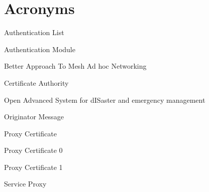 \chapter*{Acronyms}

\begin{acronym}


 {Authentication List}

 {Authentication Module}

 {Better Approach To Mesh Ad hoc Networking}

 {Certificate Authority}










 {Open Advanced System for dISaster and emergency management}

 {Originator Message}



 {Proxy Certificate}

 {Proxy Certificate 0}

 {Proxy Certificate 1}





 {Service Proxy}


%

\end{acronym}
